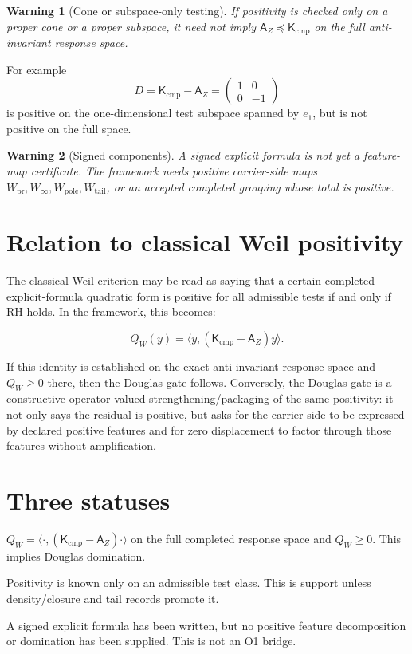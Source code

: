 \documentclass[11pt]{article}
\newtheorem{warning}{Warning}
\newcommand{\AZ}{\mathsf A_Z}
\newcommand{\Kcmp}{\mathsf K_{\mathrm{cmp}}}
\begin{document}
\begin{warning}[Cone or subspace-only testing]
If positivity is checked only on a proper cone or a proper subspace, it need not
imply \(\AZ\preceq\Kcmp\) on the full anti-invariant response space.
\end{warning}

For example
\[
        D=\Kcmp-\AZ=
        \begin{pmatrix}1&0\\0&-1\end{pmatrix}
\]
is positive on the one-dimensional test subspace spanned by \(e_1\), but is not
positive on the full space.

\begin{warning}[Signed components]
A signed explicit formula is not yet a feature-map certificate.  The framework
needs positive carrier-side maps \(W_{\mathrm{pr}},W_\infty,W_{\mathrm{pole}},
W_{\mathrm{tail}}\), or an accepted completed grouping whose total is positive.
\end{warning}

\section{Relation to classical Weil positivity}

The classical Weil criterion may be read as saying that a certain completed
explicit-formula quadratic form is positive for all admissible tests if and only
if RH holds.  In the framework, this becomes:

\[
        Q_W(y)=\langle y,(\Kcmp-\AZ)y\rangle.
\]

If this identity is established on the exact anti-invariant response space and
\(Q_W\ge0\) there, then the Douglas gate follows.  Conversely, the Douglas gate
is a constructive operator-valued strengthening/packaging of the same
positivity: it not only says the residual is positive, but asks for the carrier
side to be expressed by declared positive features and for zero displacement to
factor through those features without amplification.

\section{Three statuses}

\begin{description}[leftmargin=2.8cm]
\item[\texttt{Weil-positive-full}] \(Q_W=\langle\cdot,(\Kcmp-\AZ)\cdot\rangle\) on the full completed response space and \(Q_W\ge0\).  This implies Douglas domination.
\item[\texttt{Weil-positive-test}] Positivity is known only on an admissible test class.  This is support unless density/closure and tail records promote it.
\item[\texttt{signed-EF-only}] A signed explicit formula has been written, but no positive feature decomposition or domination has been supplied.  This is not an O1 bridge.
\end{description}
\end{document}
